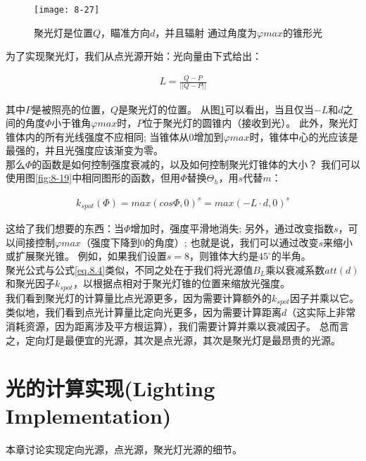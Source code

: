 \begin{figure}[h]
    \texttt{[image: 8-27]}
    \centering
    \caption{聚光灯是位置$Q$，瞄准方向$d$，并且辐射
通过角度为$\varphi max$的锥形光}
    \label{fig:8-27}
\end{figure}

\begin{flushleft}
为了实现聚光灯，我们从点光源开始：光向量由下式给出：\\
\end{flushleft}

\begin{align*}
L=\frac{Q-P}{||Q-P||}
\end{align*}

\begin{flushleft}
其中$P$是被照亮的位置，$Q$是聚光灯的位置。 从图\ref{fig:8-27}可以看出，当且仅当$-L$和$d$之间的角度$\Phi$小于锥角$\varphi max$时，$P$位于聚光灯的圆锥内（接收到光）。 此外，聚光灯锥体内的所有光线强度不应相同; 当锥体从0增加到$\varphi max$时，锥体中心的光应该是最强的，并且光强度应该渐变为零。\\
那么$\Phi$的函数是如何控制强度衰减的，以及如何控制聚光灯锥体的大小？ 我们可以使用图\ref{fig:8-19}中相同图形的函数，但用$\Phi$替换$\Theta_{h}$，用$s$代替$m$：\\
\end{flushleft}

\begin{align*}
k_{spot}(\Phi)=max(cos\Phi,0)^{s}=max(-L\cdot d,0)^{s}
\end{align*}

\begin{flushleft}
这给了我们想要的东西：当$\Phi$增加时，强度平滑地消失; 另外，通过改变指数$s$，可以间接控制$\varphi max$（强度下降到0的角度）; 也就是说，我们可以通过改变$s$来缩小或扩展聚光锥。 例如，如果我们设置$s = 8$，则锥体大约是$45^{\circ}$的半角。\\
聚光公式与公式\ref{eq.8.4}类似，不同之处在于我们将光源值$B_{L}$乘以衰减系数$att(d)$和聚光因子$k_{spot}$，以根据点相对于聚光灯锥的位置来缩放光强度。\\
我们看到聚光灯的计算量比点光源更多，因为需要计算额外的$k_{spot}$因子并乘以它。 类似地，我们看到点光计算量比定向光更多，因为需要计算距离$d$（这实际上非常消耗资源，因为距离涉及平方根运算），我们需要计算并乘以衰减因子。 总而言之，定向灯是最便宜的光源，其次是点光源，其次是聚光灯是最昂贵的光源。
\end{flushleft}

\section{光的计算实现(Lighting Implementation)}
\begin{flushleft}
本章讨论实现定向光源，点光源，聚光灯光源的细节。
\end{flushleft}

